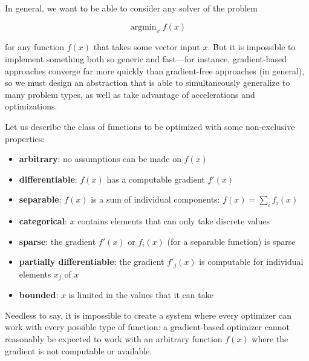 \documentclass{article}
\begin{document}
In general, we want to be able to consider any solver of the problem

\vspace*{-0.5em}
\begin{equation}
\operatorname{argmin}_{x} f(x)
\end{equation}
\vspace*{-1.3em}

\noindent for any function $f(x)$ that takes some vector input $x$.  But it
is impossible to implement something both so generic and fast---for instance,
gradient-based approaches converge far more quickly than gradient-free
approaches (in general), so we must design an abstraction that is able to
simultaneously generalize to many problem types, as well as take advantage of
accelerations and optimizations.

Let us describe the class of functions to be optimized with some non-exclusive
properties:

\vspace*{-0.4em}
\begin{itemize} \itemsep -1pt
  \item {\bf arbitrary}: no assumptions can be made on $f(x)$
  \item {\bf differentiable}: $f(x)$ has a computable gradient $f'(x)$
  \item {\bf separable}: $f(x)$ is a sum of individual components: $f(x) =
\sum_{i} f_i(x)$
  \item {\bf categorical}: $x$ contains elements that can only take discrete
values
  \item {\bf sparse}: the gradient $f'(x)$ or $f_i(x)$ (for a separable
function) is sparse
  \item {\bf partially differentiable}: the gradient $f'_j(x)$ is computable for
individual elements $x_j$ of $x$
  \item {\bf bounded}: $x$ is limited in the values that it can take
\end{itemize}
\vspace*{-0.4em}

Needless to say, it is impossible to create a system where every optimizer can
work with every possible type of function: a gradient-based optimizer cannot
reasonably be expected to work with an arbitrary function $f(x)$ where the
gradient is not computable or available.
\end{document}
